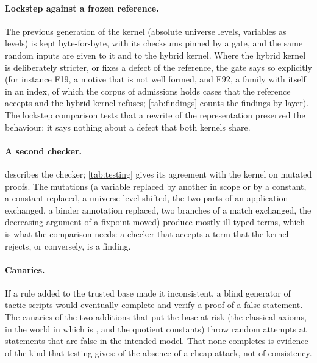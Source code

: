 \paragraph{Lockstep against a frozen reference.}
The previous generation of the kernel (absolute universe levels, variables as levels) is kept byte-for-byte, with its checksums pinned by a gate, and the same random inputs are given to it and to the hybrid kernel.
Where the hybrid kernel is deliberately stricter, or fixes a defect of the reference, the gate says so explicitly (for instance F19, a motive that is not well formed, and F92, a family with itself in an index, of which the corpus of admissions holds \lockDepartures{} cases that the reference accepts and the hybrid kernel refuses; \cref{tab:findings} counts the findings by layer).
The lockstep comparison tests that a rewrite of the representation preserved the behaviour; it says nothing about a defect that both kernels share.

\paragraph{A second checker.}
 describes the checker; \cref{tab:testing} gives its agreement with the kernel on mutated proofs.
The mutations (a variable replaced by another in scope or by a constant, a constant replaced, a universe level shifted, the two parts of an application exchanged, a binder annotation replaced, two branches of a match exchanged, the decreasing argument of a fixpoint moved) produce mostly ill-typed terms, which is what the comparison needs: a checker that accepts a term that the kernel rejects, or conversely, is a finding.

\paragraph{Canaries.}
If a rule added to the trusted base made it inconsistent, a blind generator of tactic scripts would eventually complete and verify a proof of a false statement.
The canaries of the two additions that put the base at risk (the classical axioms, in the world in which  is , and the quotient constants) throw random attempts at statements that are false in the intended model.
That none completes is evidence of the kind that testing gives: of the absence of a cheap attack, not of consistency.

